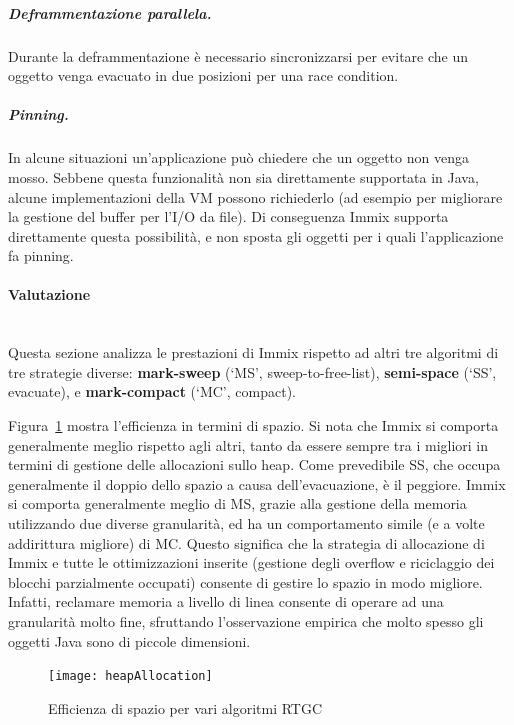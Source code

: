 \subparagraph{Deframmentazione parallela.} Durante la deframmentazione è necessario sincronizzarsi per evitare che un oggetto venga evacuato in due posizioni per una race condition. 

\subparagraph{Pinning.} In alcune situazioni un'applicazione può chiedere che un oggetto non venga mosso. Sebbene questa funzionalità non sia direttamente supportata in Java, alcune implementazioni della VM possono richiederlo (ad esempio per migliorare la gestione del buffer per l'I/O da file). Di conseguenza Immix supporta direttamente questa possibilità, e non sposta gli oggetti per i quali l'applicazione fa pinning.

\paragraph{Valutazione} \mbox{} \\
Questa sezione analizza le prestazioni di Immix rispetto ad altri tre algoritmi di tre strategie diverse: \textbf{mark-sweep} (‘MS’, sweep-to-free-list), \textbf{semi-space} (‘SS’, evacuate),
e \textbf{mark-compact} (‘MC’, compact). 

Figura~\ref{fig:heapallocation} mostra l'efficienza in termini di spazio. Si nota che Immix si comporta generalmente meglio rispetto agli altri, tanto da essere sempre tra i migliori in termini di gestione delle allocazioni sullo heap. Come prevedibile SS, che occupa generalmente il doppio dello spazio a causa dell'evacuazione, è il peggiore. Immix si comporta generalmente meglio di MS, grazie alla gestione della memoria utilizzando due diverse granularità, ed ha un comportamento simile (e a volte addirittura migliore) di MC. Questo significa che la strategia di allocazione di Immix e tutte le ottimizzazioni inserite (gestione degli overflow e riciclaggio dei blocchi parzialmente occupati) consente di gestire lo spazio in modo migliore. Infatti, reclamare memoria a livello di linea consente di operare ad una granularità molto fine, sfruttando l'osservazione empirica che molto spesso gli oggetti Java sono di piccole dimensioni.
\begin{figure}[h]
	\centering
	\texttt{[image: heapAllocation]}
	\caption[Efficienza di spazio]{Efficienza di spazio per vari algoritmi RTGC}
	\label{fig:heapallocation}
\end{figure}


